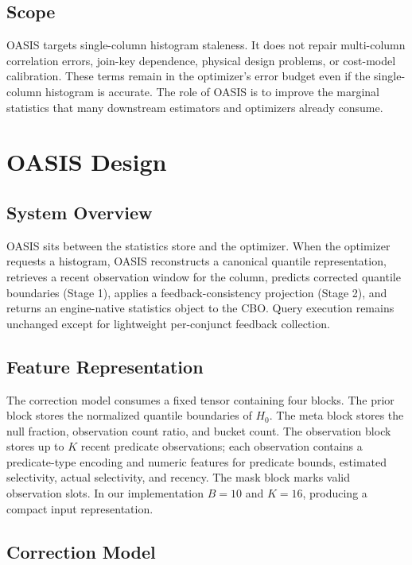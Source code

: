 \documentclass[preprint,12pt]{elsarticle}
\begin{document}
\subsection{Scope}

OASIS targets single-column histogram staleness. It does not repair
multi-column correlation errors, join-key dependence, physical design
problems, or cost-model calibration. These terms remain in the optimizer's
error budget even if the single-column histogram is accurate. The role of
OASIS is to improve the marginal statistics that many downstream estimators and
optimizers already consume.

\section{OASIS Design}
\label{sec:design}

\subsection{System Overview}

OASIS sits between the statistics store and the optimizer. When the optimizer
requests a histogram, OASIS reconstructs a canonical quantile representation,
retrieves a recent observation window for the column, predicts corrected
quantile boundaries (Stage 1), applies a feedback-consistency projection
(Stage 2), and returns an engine-native statistics object to the CBO. Query execution remains
unchanged except for lightweight per-conjunct feedback collection.

\subsection{Feature Representation}

The correction model consumes a fixed tensor containing four blocks. The prior
block stores the normalized quantile boundaries of $H_0$. The meta block stores
the null fraction, observation count ratio, and bucket count. The observation
block stores up to $K$ recent predicate observations; each observation contains
a predicate-type encoding and numeric features for predicate bounds, estimated
selectivity, actual selectivity, and recency. The mask block marks valid
observation slots. In our implementation $B=10$ and $K=16$, producing a compact
input representation.

\subsection{Correction Model}
\end{document}
